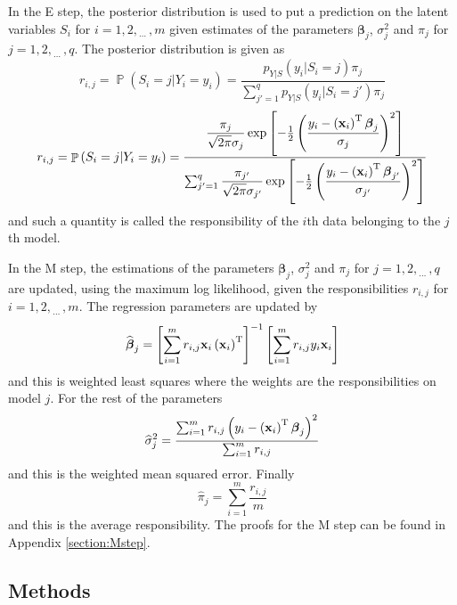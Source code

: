 \documentclass[12pt]{report}
\DeclareMathOperator{\prob}{\mathbb{P}}
\newcommand{\T}{^\textup{T}}
\newcommand{\dotdotdot}{_{\phantom{.}\cdots}}
\newcommand{\vect}[1]{\mathbf{#1}}
\newcommand{\vectGreek}[1]{\boldsymbol{#1}}
\begin{document}
In the E step, the posterior distribution is used to put a prediction on the latent variables $S_i$ for $i=1,2,\dotdotdot,m$ given estimates of the parameters $\vectGreek{\beta}_j$, $\sigma_j^2$ and $\pi_j$ for $j=1,2,\dotdotdot,q$. The posterior distribution is given as
\begin{equation*}
r_{i,j}=\prob\left(S_i=j|Y_i=y_i\right)=\frac
{p_{Y|S}\left(y_i|S_i=j\right)\pi_j}
{\sum_{j'=1}^qp_{Y|S}\left(y_i|S_i=j'\right)\pi_j}
\end{equation*}
\begin{equation}
r_{i,j}=\prob\left(S_i=j|Y_i=y_i\right)=\dfrac
{\dfrac{\pi_j}{\sqrt{2\pi}\sigma_j}\exp\left[-\frac{1}{2}\left(\dfrac{y_i-\left(\vect{x}_i\right)\T\vectGreek{\beta}_j}{\sigma_j}\right)^2\right] }
{\sum_{j'=1}^q\dfrac{\pi_{j'}}{\sqrt{2\pi}\sigma_{j'}}\exp\left[-\frac{1}{2}\left(\dfrac{y_i-\left(\vect{x}_i\right)\T\vectGreek{\beta}_{j'}}{\sigma_{j'}}\right)^2\right] }
\end{equation}
and such a quantity is called the responsibility of the $i$th data belonging to the $j$th model.

In the M step, the estimations of the  parameters $\vectGreek{\beta}_j$, $\sigma_j^2$ and $\pi_j$ for $j=1,2,\dotdotdot,q$ are updated, using the maximum log likelihood, given the responsibilities $r_{i,j}$ for $i=1,2,\dotdotdot,m$. The regression parameters are updated by
\begin{equation}
\widehat{\vectGreek{\beta}}_j
=
\left[\sum_{i=1}^{m}r_{i,j}
\vect{x}_i\left(\vect{x}_i\right)\T\right]^{-1}
\left[\sum_{i=1}^{m}
r_{i,j}
y_i\vect{x}_i\right]
\end{equation}
and this is weighted least squares where the weights are the responsibilities on model $j$. For the rest of the parameters
\begin{equation}
\widehat{\sigma}_j^2
=
\frac{\sum_{i=1}^{m}
r_{i,j}\left({y_i-\left(\vect{x}_i\right)\T\vectGreek{\beta}_j}\right)^2}
{\sum_{i=1}^{m}r_{i,j}}
\end{equation}
and this is the weighted mean squared error.  Finally
\begin{equation}
\widehat{\pi}_j = \sum_{i=1}^m\frac{r_{i,j}}{m}
\end{equation}
and this is the average responsibility. The proofs for the M step can be found in Appendix \ref{section:Mstep}.

\subsection{Methods}
\end{document}
